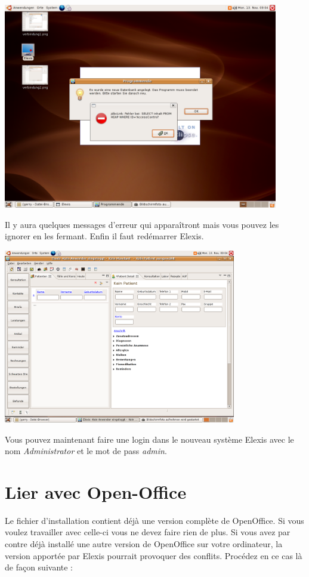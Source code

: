 \includegraphics[width=0.9\textwidth]{images/verbindung13.png}

Il y aura quelques messages d'erreur qui apparaîtront mais vous pouvez les ignorer en les fermant. Enfin il faut redémarrer Elexis.

\includegraphics[width=4in]{images/verbindung14.png}

Vous pouvez maintenant faire une login dans le nouveau système Elexis avec le nom \textit{Administrator} et le mot de pass \textit{admin}.

\section{Lier avec Open-Office}
\label{config:ooo}
Le fichier d'installation contient déjà une version complète de OpenOffice. Si vous voulez travailler avec celle-ci vous ne devez faire rien de plus. 
Si vous avez par contre déjà installé une autre version de OpenOffice sur votre ordinateur, la version apportée par Elexis pourrait provoquer des conflits. Procédez en ce cas là de façon suivante :


